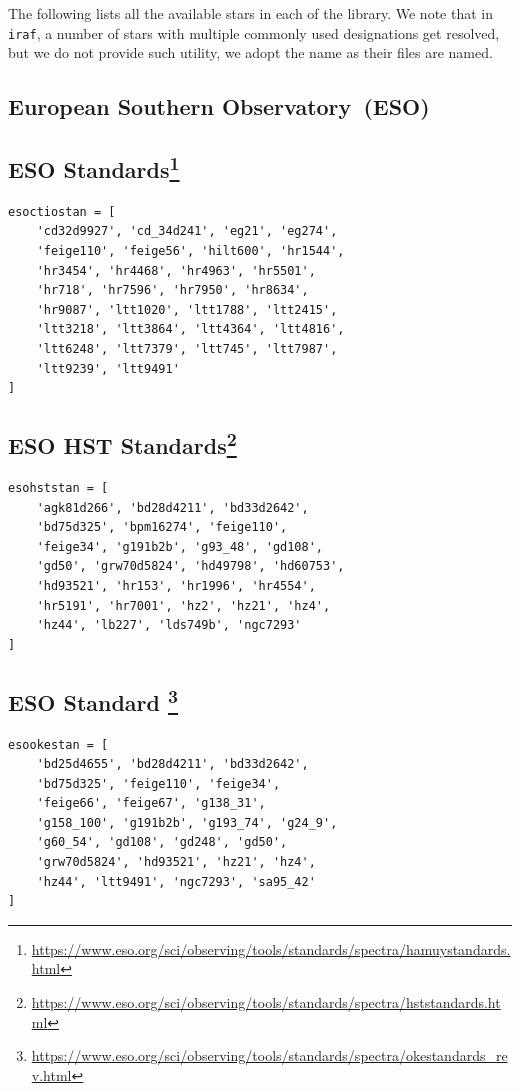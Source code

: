 \documentclass[fleqn,usenatbib]{mnras}
\begin{document}
The following lists all the available stars in each of the library. We note that
in \texttt{iraf}, a number of stars with multiple commonly used designations
get resolved, but we do not provide such utility, we adopt the name as their
files are named.

\subsection{European Southern Observatory~(ESO)}

\subsection*{ESO \citet{1992PASP..104..533H, 1994PASP..106..566H} Standards\footnote{\url{https://www.eso.org/sci/observing/tools/standards/spectra/hamuystandards.html}}}
\begin{verbatim}
esoctiostan = [
    'cd32d9927', 'cd_34d241', 'eg21', 'eg274',
    'feige110', 'feige56', 'hilt600', 'hr1544',
    'hr3454', 'hr4468', 'hr4963', 'hr5501',
    'hr718', 'hr7596', 'hr7950', 'hr8634',
    'hr9087', 'ltt1020', 'ltt1788', 'ltt2415',
    'ltt3218', 'ltt3864', 'ltt4364', 'ltt4816',
    'ltt6248', 'ltt7379', 'ltt745', 'ltt7987',
    'ltt9239', 'ltt9491'
]
\end{verbatim}

\subsection*{ESO \citet{1995AJ....110.1316B, 1996AJ....111.1743B} HST Standards\footnote{\url{https://www.eso.org/sci/observing/tools/standards/spectra/hststandards.html}}}
\begin{verbatim}
esohststan = [
    'agk81d266', 'bd28d4211', 'bd33d2642',
    'bd75d325', 'bpm16274', 'feige110',
    'feige34', 'g191b2b', 'g93_48', 'gd108',
    'gd50', 'grw70d5824', 'hd49798', 'hd60753',
    'hd93521', 'hr153', 'hr1996', 'hr4554',
    'hr5191', 'hr7001', 'hz2', 'hz21', 'hz4',
    'hz44', 'lb227', 'lds749b', 'ngc7293'
]
\end{verbatim}

\subsection*{ESO \citet{1990AJ.....99.1621O} Standard \footnote{\url{https://www.eso.org/sci/observing/tools/standards/spectra/okestandards_rev.html}}}

\begin{verbatim}
esookestan = [
    'bd25d4655', 'bd28d4211', 'bd33d2642',
    'bd75d325', 'feige110', 'feige34',
    'feige66', 'feige67', 'g138_31',
    'g158_100', 'g191b2b', 'g193_74', 'g24_9',
    'g60_54', 'gd108', 'gd248', 'gd50',
    'grw70d5824', 'hd93521', 'hz21', 'hz4',
    'hz44', 'ltt9491', 'ngc7293', 'sa95_42'
]
\end{verbatim}
\end{document}
